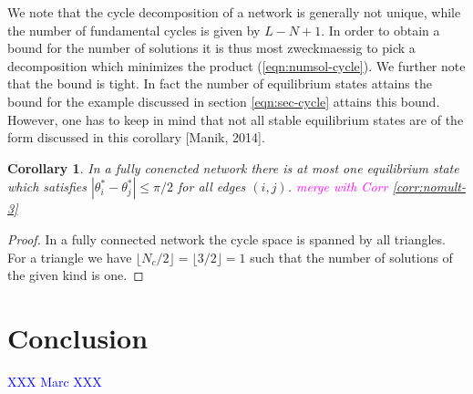 \documentclass[10pt,aps,pre,preprint,superscriptaddress]{revtex4-1}
\newcommand{\dirk}[1]{\textcolor{blue}{#1}}
\newcommand{\debsankha}[1]{\textcolor{magenta}{#1}}
\newtheorem{corr}{Corollary}
\begin{document}
We note that the cycle decomposition of a network is generally not 
unique, while the number of fundamental cycles is given by $L-N+1$.
In order to obtain a bound for the number of solutions it is
thus most zweckmaessig to pick a decomposition which minimizes
the product (\ref{eqn:numsol-cycle}). We further note that the bound is tight. 
In fact the number of equilibrium states attains the bound for the example 
discussed  in section \ref{eqn:sec-cycle} attains this bound. However, one has to 
keep in mind that not all stable equilibrium states are of the form
discussed in this corollary [Manik, 2014].

\begin{corr}
In a fully conencted network there is at most one equilibrium state which
satisfies $|\theta_i^*  - \theta_j^*| \le \pi/2$ for all edges $(i,j)$.
\debsankha{merge with Corr \ref{corr:nomult-3}}
\end{corr}

\begin{proof}
In a fully connected network the cycle space is spanned by all triangles.
For a triangle we have $\lfloor N_c/2 \rfloor = \lfloor 3/2 \rfloor = 1$ 
such that the number of solutions of the given kind is one.
\end{proof}


\section{Conclusion}



\dirk{XXX Marc XXX}







\end{document}
